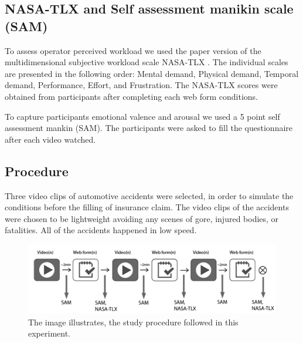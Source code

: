 \documentclass[../main/Feedback.tex]{subfiles}
\begin{document}
\subsection{NASA-TLX and Self assessment manikin scale (SAM)}
To assess operator perceived workload we used the paper version of the multidimensional subjective workload scale NASA-TLX \cite{nasatlx}.
The individual scales are presented in the following order: Mental demand, Physical demand, Temporal demand, Performance, Effort, and Frustration.
The NASA-TLX scores were obtained from participants after completing each web form conditions.

To capture participants emotional valence and arousal we used a 5 point self assessment mankin (SAM)\cite{bradley1994measuring}.  
The participants were asked to fill the questionnaire after each video watched. 


\subsection{Procedure}

Three video clips of automotive accidents were selected, in order to simulate the conditions before the filling of insurance claim.
The video clips of the accidents were chosen to be lightweight avoiding any scenes of gore, injured bodies, or fatalities. 
All of the accidents happened in low speed.

\begin{figure}[h]
	\centering
	\includegraphics[width=\linewidth]{../figures/study-procedure}
	\caption[study procedure]{The image illustrates, the study procedure followed in this experiment.}
	\label{fig:study-procedure}
\end{figure}
\end{document}
